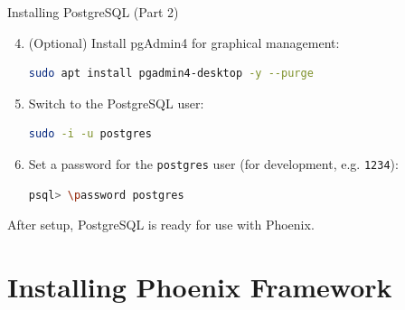 \documentclass[aspectratio=169, table]{beamer}
\begin{document}
\begin{frame}[fragile]{Installing PostgreSQL (Part 2)}
\vspace{20pt}

\begin{enumerate}
  \setcounter{enumi}{3}
  \item (Optional) Install pgAdmin4 for graphical management:
  \begin{lstlisting}[language=bash]
  sudo apt install pgadmin4-desktop -y --purge
  \end{lstlisting}

  \item Switch to the PostgreSQL user:
  \begin{lstlisting}[language=bash]
  sudo -i -u postgres
  \end{lstlisting}

  \item Set a password for the \texttt{postgres} user (for development, e.g. \texttt{1234}):
  \begin{lstlisting}[language=bash]
  psql> \password postgres
  \end{lstlisting}
\end{enumerate}

After setup, PostgreSQL is ready for use with Phoenix.
\end{frame}


\section{Installing Phoenix Framework}
\end{document}
